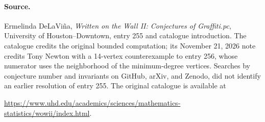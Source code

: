 \documentclass[10pt]{article}
\begin{document}
\paragraph{Source.}\raggedright
Ermelinda DeLaVi\~na, \emph{Written on the Wall II: Conjectures of
Graffiti.pc}, University of Houston--Downtown, entry 255 and catalogue
introduction. The catalogue credits the original bounded computation;
its November 21, 2026 note credits Tony Newton with a 14-vertex
counterexample to entry 256, whose numerator uses the neighborhood of
the minimum-degree vertices. Searches by conjecture number and invariants on
GitHub, arXiv, and Zenodo, did not identify an earlier resolution of entry
255. The original catalogue is available at\par\noindent
\url{https://www.uhd.edu/academics/sciences/mathematics-statistics/wowii/index.html}.
\end{document}
